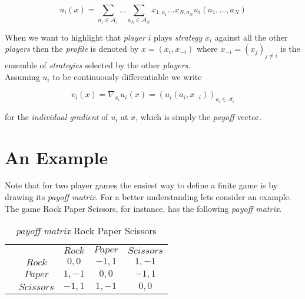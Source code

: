 \begin{equation*}
    u_i(x) = \sum_{a_1\in\mathcal{A}_1}\dots\sum_{a_N\in\mathcal{A}_N} x_{1,a_1} \dots x_{N,a_N}u_i(a_1,\dots,a_N)
\end{equation*}



When we want to highlight that \textit{player} $i$ plays \textit{strategy} $x_i$ against all the other \textit{players} then the \textit{profile} is denoted by $x = (x_i,x_{-i})$ where $x_{-i} = {(x_j)}_{j\neq i}$ is the ensemble of \textit{strategies} selected by the other \textit{players}.\\

Assuming $u_i$ to be continuously differentiable we write 

\begin{equation*}
    v_i(x) = \nabla_{x_i}u_i(x) = (u_i(a_i,x_{-i}))_{a_i\in\mathcal{A}_i}
\end{equation*}

for the \textit{individual gradient} of $u_i$ at $x$, which is simply the \textit{payoff} vector. \\

\section{An Example}\label{section:anExample}

Note that for two player games the easiest way to define a finite game is by drawing its \textit{payoff matrix}. For a better understanding lets consider an example. The game Rock Paper Scissors, for instance, has the following \textit{payoff matrix}.\\

\begin{table}[H]\centering
\setlength{\extrarowheight}{2pt}
\begin{tabular}{cc|c|c|c|}
  & \multicolumn{1}{c}{} & \multicolumn{1}{c}{$Rock$}  & \multicolumn{1}{c}{$Paper$}  & \multicolumn{1}{c}{$Scissors$} \\\cline{3-5}
            & $Rock$ & $0,0$ & $-1,1$ & $1,-1$ \\ \cline{3-5}
            & $Paper$ & $1,-1$ & $0,0$ & $-1,1$ \\\cline{3-5}
            & $Scissors$ & $-1,1$ & $1,-1$ & $0,0$ \\\cline{3-5}
\end{tabular}\caption{\label{tab:payoffRPSFromDefinition}\textit{payoff matrix} Rock Paper Scissors}
\end{table}

